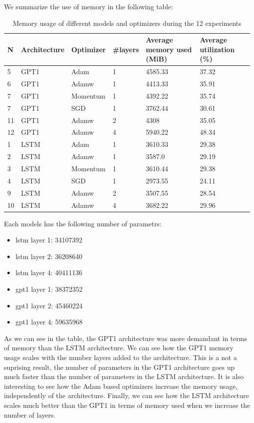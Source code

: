 \documentclass[12pt]{article}
\theoremstyle{definition}
\begin{document}
We summarize the use of memory in the following table:
\begin{table}[H]
\begin{tabular}{llllll}
\hline
\multicolumn{1}{|l|}{N} & \multicolumn{1}{l|}{Architecture} & \multicolumn{1}{l|}{Optimizer} & \multicolumn{1}{l|}{\#layers} & \multicolumn{1}{l|}{Average memory used (MiB)} & \multicolumn{1}{l|}{Average utilization (\%)} \\ \hline
5 & GPT1 & Adam & 1 & 4585.33 & 37.32 \\
6 & GPT1 & Adamw & 1 & 4413.33 & 35.91 \\
7 & GPT1 & Momentum & 1 & 4392.22 & 35.74 \\
7 & GPT1 & SGD & 1 & 3762.44 & 30.61 \\
11 & GPT1 & Adamw & 2 & 4308 & 35.05 \\
12 & GPT1 & Adamw & 4 & 5940.22 & 48.34 \\
1 & LSTM & Adam & 1 & 3610.33 & 29.38 \\
2 & LSTM & Adamw & 1 & 3587.0 & 29.19 \\
3 & LSTM & Momentum & 1 & 3610.44 & 29.38 \\
4 & LSTM & SGD & 1 & 2973.55 & 24.11 \\
9 & LSTM & Adamw & 2 & 3507.55 & 28.54 \\
10 & LSTM & Adamw & 4 & 3682.22 & 29.96
\end{tabular}
\caption{Memory usage of different models and optimizers during the 12 experiments}
\end{table}
Each models has the following number of parametrs:
\begin{itemize}
    \item lstm layer 1: 34107392
    \item lstm layer 2: 36208640
    \item lstm layer 4: 40411136
    \item gpt1 layer 1: 38372352
    \item gpt1 layer 2: 45460224
    \item gpt1 layer 4: 59635968
\end{itemize}
As we can see in the table, the GPT1 architecture was more demandant in terms of
memory than the LSTM architecture. We can see how the GPT1 memory usage scales
with the number layers added to the architecture. This is a not a suprising
result, the number of parameters in the GPT1 architecture goes up much faster
than the number of parameters in the LSTM architecture. It is also interesting
to see how the Adam based optimizers increase the memory usage, independently of
the architecture. Finally, we can see how the LSTM architecture scales much
better than the GPT1 in terms of memory used when we increase the number of
layers.
\end{document}
